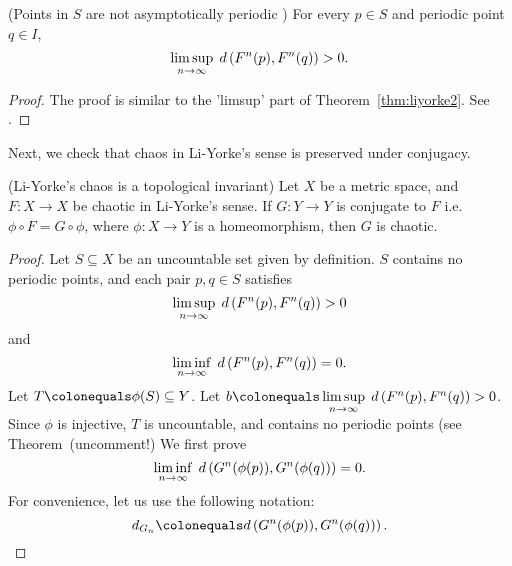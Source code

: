 \documentclass[10pt,draft,twoside]{book}
\begin{document}
\begin{theorem}
  (Points in $S$ are not asymptotically periodic \citep{li-yorke})
  For every $p \in S$ and periodic point $q \in I$,
  \begin{equation*}
    \limsup\limits_{n \to \infty}\; d\left( F^{n}(p) , F^{n}(q) \right) > 0.
  \end{equation*}
  \label{thm:liyorke3}
  \begin{proof}
    The proof is similar to the 'limsup' part of Theorem~\ref{thm:liyorke2}.
    See \citet{li-yorke}.
  \end{proof}
\end{theorem}
Next, we check that chaos in Li-Yorke's sense is preserved under conjugacy.
\begin{theorem}
  (Li-Yorke's chaos is a topological invariant)
  Let $X$ be a metric space, and $F: X\to X$ be chaotic in Li-Yorke's sense.
  If $G: Y\to Y$ is conjugate to $F$ i.e. $\phi \circ F = G \circ \phi$, where $\phi: X \to Y$ is a homeomorphism, then $G$ is chaotic.
  \begin{proof}
    Let $S \subseteq X$ be an uncountable set given by definition.
    $S$ contains no periodic points, and each pair $p,q \in S$ satisfies
    \begin{equation*}
      \limsup\limits_{n \to \infty}\; d\left( F^{n}(p) , F^{n}(q) \right) > 0
    \end{equation*}
    and
    \begin{equation*}
      \liminf\limits_{n \to \infty}\; d\left( F^{n}(p) , F^{n}(q) \right) = 0.
    \end{equation*}
    Let $T \ceq \phi(S) \subseteq Y$.
    Let $b \ceq \limsup\limits_{n \to \infty}\; \metric{\itr{F}{n}(p) , \itr{F}{n}(q)} > 0$.
    Since $\phi$ is injective, $T$ is uncountable, and contains no periodic points (see Theorem~(uncomment!)%
    We first prove
    \begin{equation*}
      \liminf\limits_{n \to \infty}\; d\left( G^{n}(\phi(p)) , G^{n}(\phi(q)) \right) = 0.
    \end{equation*}
    For convenience, let us use the following notation:
    \begin{equation*}
      d_{G_n} \ceq \metric{\itr{G}{n}(\phi(p)) , \itr{G}{n}(\phi(q))}.
    \end{equation*}


\end{proof}
\end{theorem}
\end{document}
